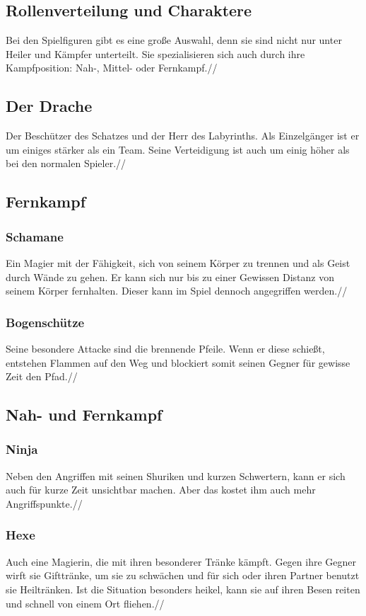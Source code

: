\documentclass[10pt,a4paper,notitlepage]{report}
\begin{document}
\begin{flushleft}
\section{Rollenverteilung und Charaktere}
Bei den Spielfiguren gibt es eine große Auswahl, denn sie sind nicht nur unter Heiler und Kämpfer unterteilt. Sie spezialisieren sich auch durch ihre Kampfposition: Nah-, Mittel- oder Fernkampf.//
\subsection{Der Drache} 
Der Beschützer des Schatzes und der Herr des Labyrinths. Als Einzelgänger ist er um einiges stärker als ein Team. Seine Verteidigung ist auch um einig höher als bei den normalen Spieler.//
\subsection{Fernkampf}
\subsubsection{Schamane}
Ein Magier mit der Fähigkeit, sich von seinem Körper zu trennen und als Geist durch Wände zu gehen. Er kann sich nur bis zu einer Gewissen Distanz von seinem Körper fernhalten. Dieser kann im Spiel dennoch angegriffen werden.//
\subsubsection{Bogenschütze}
Seine besondere Attacke sind die brennende Pfeile. Wenn er diese schießt, entstehen Flammen auf den Weg und blockiert somit seinen Gegner für gewisse Zeit den Pfad.//
\subsection{Nah- und Fernkampf}
\subsubsection{Ninja}
Neben den Angriffen mit seinen Shuriken und kurzen Schwertern, kann er sich auch für kurze Zeit unsichtbar machen. Aber das kostet ihm auch mehr Angriffspunkte.//
\subsubsection{Hexe}
Auch eine Magierin, die mit ihren besonderer Tränke kämpft. Gegen ihre Gegner wirft sie Gifttränke, um sie zu schwächen und für sich oder ihren Partner benutzt sie Heiltränken. Ist die Situation besonders heikel, kann sie auf ihren Besen reiten und schnell von einem Ort fliehen.//

\end{flushleft}
\end{document}
